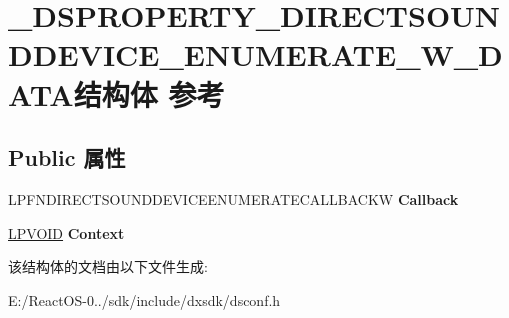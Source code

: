 \hypertarget{struct___d_s_p_r_o_p_e_r_t_y___d_i_r_e_c_t_s_o_u_n_d_d_e_v_i_c_e___e_n_u_m_e_r_a_t_e___w___d_a_t_a}{}\section{\+\_\+\+D\+S\+P\+R\+O\+P\+E\+R\+T\+Y\+\_\+\+D\+I\+R\+E\+C\+T\+S\+O\+U\+N\+D\+D\+E\+V\+I\+C\+E\+\_\+\+E\+N\+U\+M\+E\+R\+A\+T\+E\+\_\+\+W\+\_\+\+D\+A\+T\+A结构体 参考}
\label{struct___d_s_p_r_o_p_e_r_t_y___d_i_r_e_c_t_s_o_u_n_d_d_e_v_i_c_e___e_n_u_m_e_r_a_t_e___w___d_a_t_a}
\subsection*{Public 属性}
\begin{DoxyCompactItemize}
\item 
\mbox{\label{struct___d_s_p_r_o_p_e_r_t_y___d_i_r_e_c_t_s_o_u_n_d_d_e_v_i_c_e___e_n_u_m_e_r_a_t_e___w___d_a_t_a_a25c6c30aa4688d40a2f018c6b2a0d5b2}} 
L\+P\+F\+N\+D\+I\+R\+E\+C\+T\+S\+O\+U\+N\+D\+D\+E\+V\+I\+C\+E\+E\+N\+U\+M\+E\+R\+A\+T\+E\+C\+A\+L\+L\+B\+A\+C\+KW {\bfseries Callback}
\item 
\mbox{\label{struct___d_s_p_r_o_p_e_r_t_y___d_i_r_e_c_t_s_o_u_n_d_d_e_v_i_c_e___e_n_u_m_e_r_a_t_e___w___d_a_t_a_a5965c9338df64e5cbc1f15a4eb4cc350}} 
\hyperlink{interfacevoid}{L\+P\+V\+O\+ID} {\bfseries Context}
\end{DoxyCompactItemize}


该结构体的文档由以下文件生成\+:\begin{DoxyCompactItemize}
\item 
E\+:/\+React\+O\+S-\/0../sdk/include/dxsdk/dsconf.\+h\end{DoxyCompactItemize}
